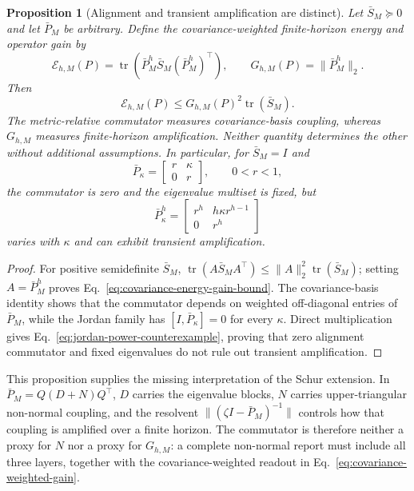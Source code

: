 \documentclass{article}
\newtheorem{proposition}{Proposition}
\DeclareMathOperator{\tr}{tr}
\begin{document}
\begin{proposition}[Alignment and transient amplification are distinct]
\label{prop:alignment-transient-separation}
Let $\bar S_M\succeq0$ and let $\bar P_M$ be arbitrary. Define the
covariance-weighted finite-horizon energy and operator gain by
\begin{equation}
\label{eq:covariance-weighted-gain}
\mathcal E_{h,M}(P)=\tr\!\left(\bar P_M^h\bar S_M
 (\bar P_M^h)^\top\right),
\qquad G_{h,M}(P)=\|\bar P_M^h\|_2.
\end{equation}
Then
\begin{equation}
\label{eq:covariance-energy-gain-bound}
\mathcal E_{h,M}(P)\leq G_{h,M}(P)^2\tr(\bar S_M).
\end{equation}
The metric-relative commutator measures covariance-basis coupling, whereas
$G_{h,M}$ measures finite-horizon amplification. Neither quantity determines
the other without additional assumptions. In particular, for
$\bar S_M=I$ and
\begin{equation}
\label{eq:fixed-spectrum-jordan-counterexample}
\bar P_\kappa=
\begin{bmatrix}r&\kappa\\0&r\end{bmatrix},\qquad 0<r<1,
\end{equation}
the commutator is zero and the eigenvalue multiset is fixed, but
\begin{equation}
\label{eq:jordan-power-counterexample}
\bar P_\kappa^h=
\begin{bmatrix}r^h&h\kappa r^{h-1}\\0&r^h\end{bmatrix}
\end{equation}
varies with $\kappa$ and can exhibit transient amplification.
\end{proposition}

\begin{proof}
For positive semidefinite $\bar S_M$,
$\tr(A\bar S_MA^\top)\leq\|A\|_2^2\tr(\bar S_M)$; setting
$A=\bar P_M^h$ proves Eq.~\eqref{eq:covariance-energy-gain-bound}.
The covariance-basis identity shows that the commutator depends on weighted
off-diagonal entries of $\bar P_M$, while the Jordan family has
$[I,\bar P_\kappa]=0$ for every $\kappa$. Direct multiplication gives
Eq.~\eqref{eq:jordan-power-counterexample}, proving that zero alignment
commutator and fixed eigenvalues do not rule out transient amplification.
\end{proof}

This proposition supplies the missing interpretation of the Schur extension.
In $\bar P_M=Q(D+N)Q^\top$, $D$ carries the eigenvalue blocks, $N$ carries
upper-triangular non-normal coupling, and the resolvent
$\|(\zeta I-\bar P_M)^{-1}\|$ controls how that coupling is amplified over a
finite horizon. The commutator is therefore neither a proxy for $N$ nor a
proxy for $G_{h,M}$: a complete non-normal report must include all three
layers, together with the covariance-weighted readout in
Eq.~\eqref{eq:covariance-weighted-gain}.
\end{document}
